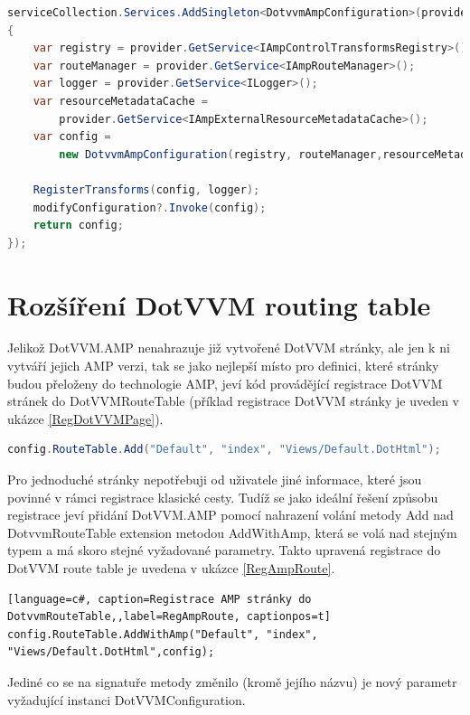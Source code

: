 \begin{lstlisting}[language=c#, caption=Registrace DotvvmAmpConfiguration,label=RegAmpConfig,captionpos=t]
serviceCollection.Services.AddSingleton<DotvvmAmpConfiguration>(provider =>
{
    var registry = provider.GetService<IAmpControlTransformsRegistry>();
    var routeManager = provider.GetService<IAmpRouteManager>();
    var logger = provider.GetService<ILogger>();
    var resourceMetadataCache =
        provider.GetService<IAmpExternalResourceMetadataCache>();
    var config =
        new DotvvmAmpConfiguration(registry, routeManager,resourceMetadataCache);
        
    RegisterTransforms(config, logger);
    modifyConfiguration?.Invoke(config);
    return config;
});
\end{lstlisting}
\section{Rozšíření DotVVM routing table}
Jelikož DotVVM.AMP nenahrazuje již vytvořené DotVVM stránky, ale jen k ni vytváří jejich AMP verzi, tak se jako nejlepší místo pro definici, které stránky budou přeloženy do technologie AMP, jeví kód provádějící registrace DotVVM stránek do DotVVMRouteTable (příklad registrace DotVVM stránky je uveden v ukázce \ref{RegDotVVMPage}).

\begin{lstlisting}[language=c#, caption=Registrace DotVVM stránky do DotvvmRouteTable,label=RegDotVVMPage,captionpos=t]
config.RouteTable.Add("Default", "index", "Views/Default.DotHtml");
\end{lstlisting}

Pro jednoduché stránky nepotřebuji od uživatele jiné informace, které jsou povinné v rámci registrace klasické cesty.
Tudíž se jako ideální řešení způsobu registrace jeví přidání DotVVM.AMP pomocí nahrazení volání metody Add nad DotvvmRouteTable extension metodou AddWithAmp, která se volá nad stejným typem a má skoro stejné vyžadované parametry. Takto upravená registrace do DotVVM route table je uvedena v ukázce \ref{RegAmpRoute}.

\begin{lstlisting}[language=c#, caption=Registrace AMP stránky do DotvvmRouteTable,,label=RegAmpRoute, captionpos=t]
config.RouteTable.AddWithAmp("Default", "index", "Views/Default.DotHtml",config);
\end{lstlisting}

Jediné co se na signatuře metody změnilo (kromě jejího názvu) je nový parametr vyžadující instanci DotVVMConfiguration.


